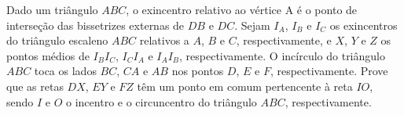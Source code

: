 Dado um triângulo $ABC$, o exincentro relativo ao vértice A é o ponto de interseção das bissetrizes externas de $DB$ e $DC$.
Sejam $I_A$, $I_B$ e $I_C$ os exincentros do triângulo escaleno $ABC$ relativos a $A$, $B$ e $C$, respectivamente, e $X$, $Y$ e $Z$ os pontos médios de $I_BI_C$, $I_CI_A$ e $I_AI_B$, respectivamente.
O incírculo do triângulo $ABC$ toca os lados $BC$, $CA$ e $AB$ nos pontos $D$, $E$ e $F$, respectivamente. Prove que as retas $DX$, $EY$ e $FZ$ têm um ponto em
comum pertencente à reta $IO$, sendo $I$ e $O$ o incentro e o circuncentro do triângulo $ABC$, respectivamente.